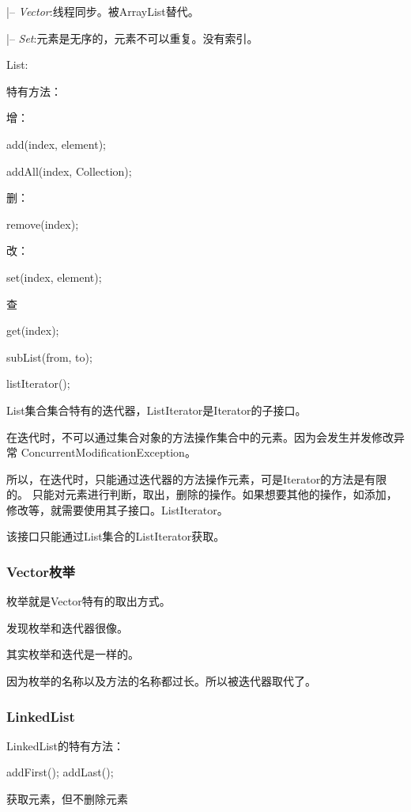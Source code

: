 \documentclass[UTF8]{ctexart}
\begin{document}
\qquad \qquad |-- \textit{Vector}:线程同步。被ArrayList替代。

\qquad |-- \textit{Set}:元素是无序的，元素不可以重复。没有索引。

List: 

特有方法：

增：

add(index, element);

addAll(index, Collection);

删：

remove(index);

改：

set(index, element);

查

get(index);

subList(from, to);

listIterator();

List集合集合特有的迭代器，ListIterator是Iterator的子接口。

在迭代时，不可以通过集合对象的方法操作集合中的元素。因为会发生并发修改异常
ConcurrentModificationException。

所以，在迭代时，只能通过迭代器的方法操作元素，可是Iterator的方法是有限的。
只能对元素进行判断，取出，删除的操作。如果想要其他的操作，如添加，修改等，就需要使用其子接口。ListIterator。

该接口只能通过List集合的ListIterator获取。



\subsubsection{Vector枚举}

枚举就是Vector特有的取出方式。

发现枚举和迭代器很像。

其实枚举和迭代是一样的。

因为枚举的名称以及方法的名称都过长。所以被迭代器取代了。



\subsubsection{LinkedList}

LinkedList的特有方法：

addFirst();
addLast();

获取元素，但不删除元素
\end{document}
